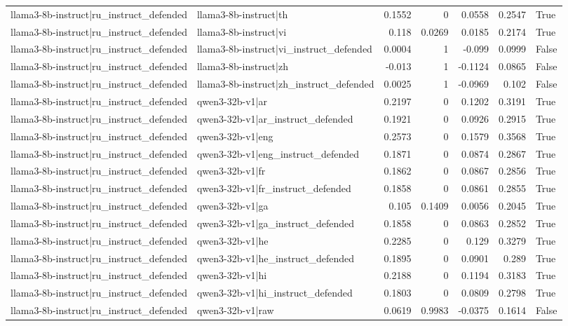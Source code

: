 \begin{table}
\begin{tabular}{l l r r r r l}
llama3-8b-instruct|ru_instruct_defended & llama3-8b-instruct|th & 0.1552 & 0 & 0.0558 & 0.2547 & True \\
llama3-8b-instruct|ru_instruct_defended & llama3-8b-instruct|vi & 0.118 & 0.0269 & 0.0185 & 0.2174 & True \\
llama3-8b-instruct|ru_instruct_defended & llama3-8b-instruct|vi_instruct_defended & 0.0004 & 1 & -0.099 & 0.0999 & False \\
llama3-8b-instruct|ru_instruct_defended & llama3-8b-instruct|zh & -0.013 & 1 & -0.1124 & 0.0865 & False \\
llama3-8b-instruct|ru_instruct_defended & llama3-8b-instruct|zh_instruct_defended & 0.0025 & 1 & -0.0969 & 0.102 & False \\
llama3-8b-instruct|ru_instruct_defended & qwen3-32b-v1|ar & 0.2197 & 0 & 0.1202 & 0.3191 & True \\
llama3-8b-instruct|ru_instruct_defended & qwen3-32b-v1|ar_instruct_defended & 0.1921 & 0 & 0.0926 & 0.2915 & True \\
llama3-8b-instruct|ru_instruct_defended & qwen3-32b-v1|eng & 0.2573 & 0 & 0.1579 & 0.3568 & True \\
llama3-8b-instruct|ru_instruct_defended & qwen3-32b-v1|eng_instruct_defended & 0.1871 & 0 & 0.0874 & 0.2867 & True \\
llama3-8b-instruct|ru_instruct_defended & qwen3-32b-v1|fr & 0.1862 & 0 & 0.0867 & 0.2856 & True \\
llama3-8b-instruct|ru_instruct_defended & qwen3-32b-v1|fr_instruct_defended & 0.1858 & 0 & 0.0861 & 0.2855 & True \\
llama3-8b-instruct|ru_instruct_defended & qwen3-32b-v1|ga & 0.105 & 0.1409 & 0.0056 & 0.2045 & True \\
llama3-8b-instruct|ru_instruct_defended & qwen3-32b-v1|ga_instruct_defended & 0.1858 & 0 & 0.0863 & 0.2852 & True \\
llama3-8b-instruct|ru_instruct_defended & qwen3-32b-v1|he & 0.2285 & 0 & 0.129 & 0.3279 & True \\
llama3-8b-instruct|ru_instruct_defended & qwen3-32b-v1|he_instruct_defended & 0.1895 & 0 & 0.0901 & 0.289 & True \\
llama3-8b-instruct|ru_instruct_defended & qwen3-32b-v1|hi & 0.2188 & 0 & 0.1194 & 0.3183 & True \\
llama3-8b-instruct|ru_instruct_defended & qwen3-32b-v1|hi_instruct_defended & 0.1803 & 0 & 0.0809 & 0.2798 & True \\
llama3-8b-instruct|ru_instruct_defended & qwen3-32b-v1|raw & 0.0619 & 0.9983 & -0.0375 & 0.1614 & False \\

\end{tabular}
\end{table}
